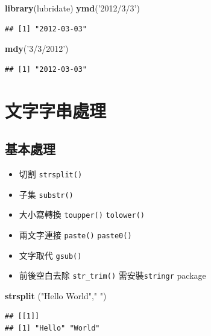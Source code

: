 \documentclass[]{book}
\newenvironment{Shaded}{\begin{snugshade}}{\end{snugshade}}
\newcommand{\KeywordTok}[1]{\textcolor[rgb]{0.13,0.29,0.53}{\textbf{{#1}}}}
\newcommand{\StringTok}[1]{\textcolor[rgb]{0.31,0.60,0.02}{{#1}}}
\newcommand{\NormalTok}[1]{{#1}}
\providecommand{\tightlist}{%
  \setlength{\itemsep}{0pt}\setlength{\parskip}{0pt}}
\theoremstyle{definition}
\theoremstyle{definition}
\theoremstyle{remark}
\begin{document}
\begin{Shaded}
\begin{Highlighting}[]
\KeywordTok{library}\NormalTok{(lubridate)}
\KeywordTok{ymd}\NormalTok{(}\StringTok{'2012/3/3'}\NormalTok{)}
\end{Highlighting}
\end{Shaded}

\begin{verbatim}
## [1] "2012-03-03"
\end{verbatim}

\begin{Shaded}
\begin{Highlighting}[]
\KeywordTok{mdy}\NormalTok{(}\StringTok{'3/3/2012'}\NormalTok{)}
\end{Highlighting}
\end{Shaded}

\begin{verbatim}
## [1] "2012-03-03"
\end{verbatim}

\section{文字字串處理}

\subsection{基本處理}

\begin{itemize}
\tightlist
\item
  切割 \texttt{strsplit()}
\item
  子集 \texttt{substr()}
\item
  大小寫轉換 \texttt{toupper()} \texttt{tolower()}
\item
  兩文字連接 \texttt{paste()} \texttt{paste0()}
\item
  文字取代 \texttt{gsub()}
\item
  前後空白去除 \texttt{str\_trim()}
  需安裝\texttt{stringr}\citep{R-stringr} package
\end{itemize}

\begin{Shaded}
\begin{Highlighting}[]
\KeywordTok{strsplit} \NormalTok{(}\StringTok{"Hello World"}\NormalTok{,}\StringTok{" "}\NormalTok{)}
\end{Highlighting}
\end{Shaded}

\begin{verbatim}
## [[1]]
## [1] "Hello" "World"
\end{verbatim}
\end{document}
